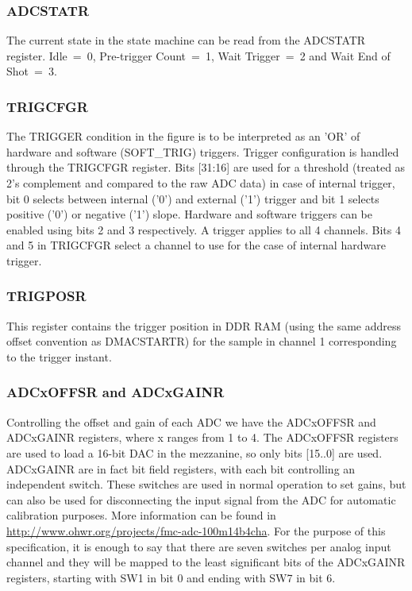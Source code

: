 \documentclass{article}
\begin{document}
\subsubsection{ADCSTATR}
The current state in the state machine can be read from the ADCSTATR register. Idle~=~0, Pre-trigger Count~=~1, Wait Trigger~=~2 and Wait End of Shot~=~3.

\subsubsection{TRIGCFGR}
The TRIGGER condition in the figure is to be interpreted as an 'OR' of hardware and software (SOFT\_TRIG) triggers. Trigger configuration is handled through the TRIGCFGR register. Bits [31:16] are used for a threshold (treated as 2's complement and compared to the raw ADC data) in case of internal trigger, bit 0 selects between internal ('0') and external ('1') trigger and bit 1 selects positive ('0') or negative ('1') slope. Hardware and software triggers can be enabled using bits 2 and 3 respectively. A trigger applies to all 4 channels. Bits 4 and 5 in TRIGCFGR select a channel to use for the case of internal hardware trigger.  

\subsubsection{TRIGPOSR}
This register contains the trigger position in DDR RAM (using the same address offset convention as DMACSTARTR) for the sample in channel 1 corresponding to the trigger instant.

\subsubsection{ADCxOFFSR and ADCxGAINR}
Controlling the offset and gain of each ADC we have the ADCxOFFSR and ADCxGAINR registers, where x ranges from 1 to 4. The ADCxOFFSR registers are used to load a 16-bit DAC in the mezzanine, so only bits [15..0] are used. ADCxGAINR are in fact bit field registers, with each bit controlling an independent switch. These switches are used in normal operation to set gains, but can also be used for disconnecting the input signal from the ADC for automatic calibration purposes. More information can be found in \href{http://www.ohwr.org/projects/fmc-adc-100m14b4cha}{http://www.ohwr.org/projects/fmc-adc-100m14b4cha}. For the purpose of this specification, it is enough to say that there are seven switches per analog input channel and they will be mapped to the least significant bits of the ADCxGAINR registers, starting with SW1 in bit 0 and ending with SW7 in bit 6.
\end{document}
